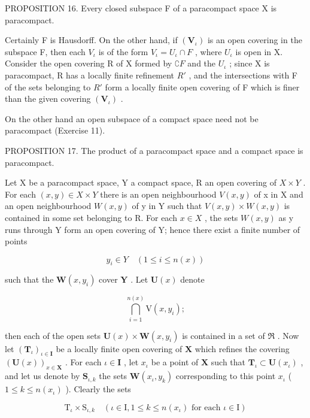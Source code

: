 PROPOSITION 16. Every closed subspace F of a paracompact space X is paracompact.

Certainly F is Hausdorff. On the other hand, if \((\mathbf{V}_{\iota})\) is an open covering in the subspace F, then each \(V_{\iota}\) is of the form \(V_{\iota} = U_{\iota} \cap F\) , where \(U_{\iota}\) is open in X. Consider the open covering R of X formed by \(\complement F\) and the \(U_{\iota}\) ; since X is paracompact, R has a locally finite refinement \(R'\) , and the intersections with F of the sets belonging to \(R'\) form a locally finite open covering of F which is finer than the given covering \((\mathbf{V}_{\iota})\) .

On the other hand an open subspace of a compact space need not be paracompact (Exercise 11).

PROPOSITION 17. The product of a paracompact space and a compact space is paracompact.

Let X be a paracompact space, Y a compact space, R an open covering of \(X \times Y\) . For each \((x, y) \in X \times Y\) there is an open neighbourhood \(V(x, y)\) of x in X and an open neighbourhood \(W(x, y)\) of y in Y such that \(V(x, y) \times W(x, y)\) is contained in some set belonging to R. For each \(x \in X\) , the sets \(W(x, y)\) as y runs through Y form an open covering of Y; hence there exist a finite number of points

\[
y _ {i} \in Y \quad (1 \leqslant i \leqslant n (x))
\]

such that the \(\mathbf{W}(x, y_i)\) cover \(\mathbf{Y}\) . Let \(\mathbf{U}(x)\) denote

\[
\bigcap_ {i = 1} ^ {n (x)} \mathrm{V} (x, y _ {i});
\]

then each of the open sets \(\mathbf{U}(x) \times \mathbf{W}(x, y_i)\) is contained in a set of \(\Re\) . Now let \((\mathbf{T}_{\iota})_{\iota \in \mathbf{I}}\) be a locally finite open covering of \(\mathbf{X}\) which refines the covering \((\mathbf{U}(x))_{x \in \mathbf{X}}\) . For each \(\iota \in \mathbf{I}\) , let \(x_{\iota}\) be a point of \(\mathbf{X}\) such that \(\mathbf{T}_{\iota} \subset \mathbf{U}(x_{\iota})\) , and let us denote by \(\mathbf{S}_{\iota,k}\) the sets \(\mathbf{W}(x_{\iota}, y_k)\) corresponding to this point \(x_{\iota}\) ( \(1 \leqslant k \leqslant n(x_{\iota})\) ). Clearly the sets

\[
\mathrm{T} _ {\iota} \times \mathrm{S} _ {\iota, k} \quad (\iota \in \mathrm{I}, 1 \leqslant k \leqslant n (x _ {\iota}) \text {   for   each   } \iota \in \mathrm{I})
\]

